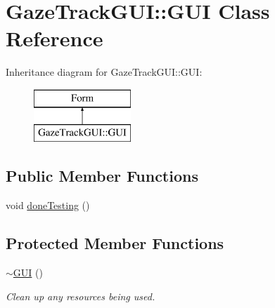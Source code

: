 \hypertarget{class_gaze_track_g_u_i_1_1_g_u_i}{}\section{Gaze\+Track\+G\+UI\+:\+:G\+UI Class Reference}
\label{class_gaze_track_g_u_i_1_1_g_u_i}
Inheritance diagram for Gaze\+Track\+G\+UI\+:\+:G\+UI\+:\begin{figure}[H]
\begin{center}
\leavevmode
\includegraphics[height=2.000000cm]{class_gaze_track_g_u_i_1_1_g_u_i}
\end{center}
\end{figure}
\subsection*{Public Member Functions}
\begin{DoxyCompactItemize}
\item 
void \mbox{\hyperlink{class_gaze_track_g_u_i_1_1_g_u_i_a81f7231e79205914ef55c6b04845fa36}{done\+Testing}} ()
\end{DoxyCompactItemize}
\subsection*{Protected Member Functions}
\begin{DoxyCompactItemize}
\item 
\mbox{\hyperlink{class_gaze_track_g_u_i_1_1_g_u_i_ae82682864152b6a1f2f1f6abfb39bb22}{$\sim$\+G\+UI}} ()
\begin{DoxyCompactList}\small\item\em Clean up any resources being used. \end{DoxyCompactList}\end{DoxyCompactItemize}
